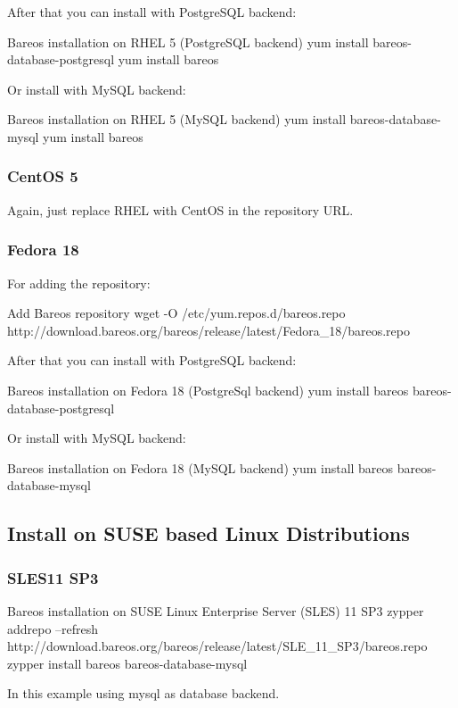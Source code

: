 After that you can install with PostgreSQL backend:
\begin{commands}{Bareos installation on RHEL 5 (PostgreSQL backend)}
yum install bareos-database-postgresql
yum install bareos
\end{commands}

Or install with MySQL backend:
\begin{commands}{Bareos installation on RHEL 5 (MySQL backend)}
yum install bareos-database-mysql
yum install bareos
\end{commands}

\subsubsection{CentOS 5}

Again, just replace RHEL with CentOS in the repository URL.

\subsubsection{Fedora 18}

For adding the repository:
\begin{commands}{Add Bareos repository}
wget -O /etc/yum.repos.d/bareos.repo http://download.bareos.org/bareos/release/latest/Fedora_18/bareos.repo
\end{commands}

After that you can install with PostgreSQL backend:
\begin{commands}{Bareos installation on Fedora 18 (PostgreSql backend)}
yum install bareos bareos-database-postgresql
\end{commands}

Or install with MySQL backend:
\begin{commands}{Bareos installation on Fedora 18 (MySQL backend)}
yum install bareos bareos-database-mysql
\end{commands}

\subsection{Install on SUSE based Linux Distributions}

\subsubsection{SLES11 SP3}

\begin{commands}{Bareos installation on SUSE Linux Enterprise Server (SLES) 11 SP3}
zypper addrepo --refresh http://download.bareos.org/bareos/release/latest/SLE_11_SP3/bareos.repo
zypper install bareos bareos-database-mysql
\end{commands}
In this example using mysql as database backend.

